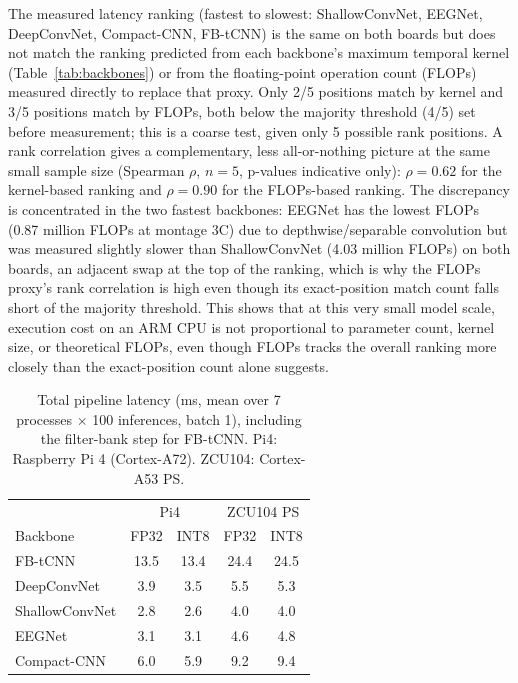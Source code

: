 \documentclass[11pt,a4paper,twoside,asymmetric]{article}
\begin{document}
The measured latency ranking (fastest to slowest: ShallowConvNet, EEGNet, DeepConvNet, Compact-CNN, FB-tCNN) is the same on both boards but does not match the ranking predicted from each backbone's maximum temporal kernel (Table~\ref{tab:backbones}) or from the floating-point operation count (FLOPs) measured directly to replace that proxy. Only 2/5 positions match by kernel and 3/5 positions match by FLOPs, both below the majority threshold (4/5) set before measurement; this is a coarse test, given only 5 possible rank positions. A rank correlation gives a complementary, less all-or-nothing picture at the same small sample size (Spearman $\rho$, $n=5$, p-values indicative only): $\rho=0.62$ for the kernel-based ranking and $\rho=0.90$ for the FLOPs-based ranking. The discrepancy is concentrated in the two fastest backbones: EEGNet has the lowest FLOPs (0.87 million FLOPs at montage 3C) due to depthwise/separable convolution but was measured slightly slower than ShallowConvNet (4.03 million FLOPs) on both boards, an adjacent swap at the top of the ranking, which is why the FLOPs proxy's rank correlation is high even though its exact-position match count falls short of the majority threshold. This shows that at this very small model scale, execution cost on an ARM CPU is not proportional to parameter count, kernel size, or theoretical FLOPs, even though FLOPs tracks the overall ranking more closely than the exact-position count alone suggests.

\begin{table}[htbp]
\caption{Total pipeline latency (ms, mean over 7 processes $\times$ 100 inferences, batch 1), including the filter-bank step for FB-tCNN. Pi4: Raspberry Pi 4 (Cortex-A72). ZCU104: Cortex-A53 PS.}
\label{tab:rq4latency}
\begin{center}
\footnotesize
\begin{tabular}{lcccc}
\toprule
 & \multicolumn{2}{c}{Pi4} & \multicolumn{2}{c}{ZCU104 PS} \\
Backbone & FP32 & INT8 & FP32 & INT8 \\
\midrule
FB-tCNN & 13.5 & 13.4 & 24.4 & 24.5 \\
DeepConvNet & 3.9 & 3.5 & 5.5 & 5.3 \\
ShallowConvNet & 2.8 & 2.6 & 4.0 & 4.0 \\
EEGNet & 3.1 & 3.1 & 4.6 & 4.8 \\
Compact-CNN & 6.0 & 5.9 & 9.2 & 9.4 \\
\bottomrule
\end{tabular}
\end{center}
\end{table}
\end{document}

